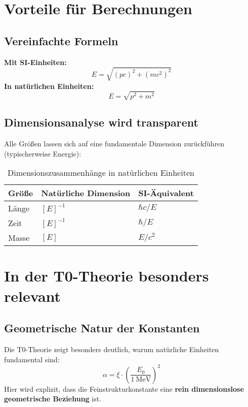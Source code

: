 \documentclass[12pt,a4paper]{article}
\begin{document}
	\section{Vorteile für Berechnungen}
	
	\subsection{Vereinfachte Formeln}
	\textbf{Mit SI-Einheiten:}
	\begin{equation}
		E = \sqrt{(p c)^2 + (m c^2)^2}
	\end{equation}
	\textbf{In natürlichen Einheiten:}
	\begin{equation}
		E = \sqrt{p^2 + m^2}
	\end{equation}
	
	\subsection{Dimensionsanalyse wird transparent}
	Alle Größen lassen sich auf eine fundamentale Dimension zurückführen (typischerweise Energie):
	\begin{table}[h]
		\centering
		\begin{tabular}{lll}
			\toprule
			\textbf{Größe} & \textbf{Natürliche Dimension} & \textbf{SI-Äquivalent} \\
			\midrule
			Länge & $[E]^{-1}$ & $\hbar c / E$ \\
			Zeit & $[E]^{-1}$ & $\hbar / E$ \\
			Masse & $[E]$ & $E/c^2$ \\
			\bottomrule
		\end{tabular}
		\caption{Dimensionszusammenhänge in natürlichen Einheiten}
	\end{table}
	
	\section{In der T0-Theorie besonders relevant}
	
	\subsection{Geometrische Natur der Konstanten}
	Die T0-Theorie zeigt besonders deutlich, warum natürliche Einheiten fundamental sind:
	\begin{equation}
		\alpha = \xi \cdot \left( \frac{E_0}{1~\mathrm{MeV}} \right)^2
	\end{equation}
	Hier wird explizit, dass die Feinstrukturkonstante eine \textbf{rein dimensionslose geometrische Beziehung} ist.
	
\end{document}
